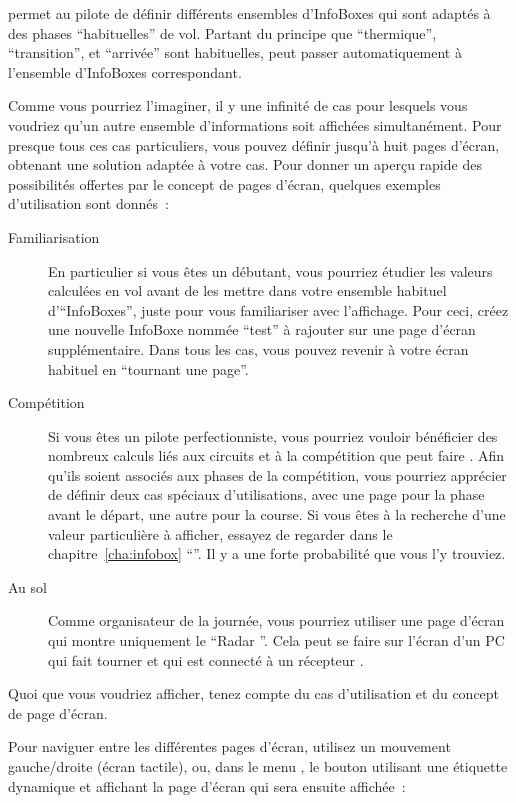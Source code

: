 \xc{} permet au pilote de définir différents ensembles d'InfoBoxes qui sont
adaptés à des phases ``habituelles'' de vol. Partant du principe que ``thermique'',
``transition'', et ``arrivée'' sont habituelles, \xc{} peut passer automatiquement
à l'ensemble d'InfoBoxes correspondant.

Comme vous pourriez l'imaginer, il y une infinité de cas pour lesquels vous voudriez qu'un autre
ensemble d'informations soit affichées simultanément. Pour presque tous ces
cas particuliers, vous pouvez définir jusqu'à huit pages d'écran, obtenant une solution
adaptée à votre cas. Pour donner un aperçu rapide des possibilités 
offertes par le concept de pages d'écran, quelques exemples d'utilisation sont donnés~:
\label{par:use_case}
\begin{description}
\item[Familiarisation] En particulier si vous êtes un débutant, vous pourriez étudier
les valeurs calculées en vol avant de les mettre dans votre ensemble habituel d'``InfoBoxes'',
juste pour vous familiariser avec l'affichage. Pour ceci, créez une nouvelle InfoBoxe
nommée ``test'' à rajouter sur une page d'écran supplémentaire. Dans
tous les cas, vous pouvez revenir à votre écran habituel en ``tournant une page''.
\item[Compétition] Si vous êtes un pilote perfectionniste, vous pourriez vouloir
bénéficier des nombreux calculs liés aux circuits et à la compétition que peut faire \xc.
Afin qu'ils soient associés aux phases de la compétition, vous pourriez apprécier
de définir deux cas spéciaux d'utilisations, avec une page pour la phase avant le départ,
une autre pour la course. Si vous êtes à la recherche d'une valeur particulière à 
afficher, essayez de regarder dans le chapitre~\ref{cha:infobox} ``''.
Il y a une forte probabilité que vous l'y trouviez.
\item[Au sol] Comme organisateur de la journée, vous pourriez utiliser une page d'écran qui
montre uniquement le ``Radar \fl''. Cela peut se faire sur l'écran d'un PC qui fait tourner \xc{}
et qui est connecté à un récepteur \fl.
\end{description}

Quoi que vous voudriez afficher, tenez compte du cas d'utilisation et du concept
de page d'écran.

Pour naviguer entre les différentes pages d'écran, utilisez un mouvement gauche/droite (écran tactile),
ou, dans le menu \mbox{,} le bouton utilisant une étiquette dynamique et affichant
la page d'écran qui sera ensuite affichée~:

